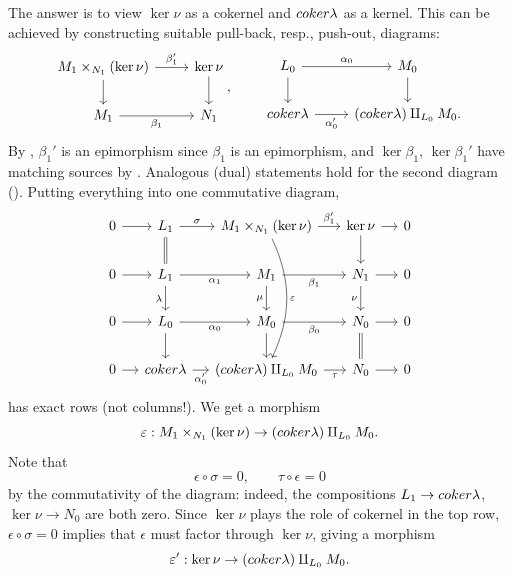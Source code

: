 The answer is to view $\ker\nu$ as a cokernel and $coker\lambda$ as a
kernel. This can be achieved by constructing suitable pull-back,
resp., push-out, diagrams:
\[\begin{tikzcd}
    M_1 \times_{N_1} (\ker\nu) \arrow[r, "\beta_1'"] \arrow[d] &
    \ker\nu \arrow[d] \\
    M_1 \arrow[r, "\beta_1"'] & N_1
  \end{tikzcd}\!, \qquad
  \begin{tikzcd}
    L_0 \arrow[r, "\alpha_0"] \arrow[d] & M_0 \arrow[d] \\
    \coker\lambda \arrow[r, "\alpha_0'"'] & (\coker\lambda)
    \amalg_{L_0} M_0.
  \end{tikzcd}\] By , $\beta_1'$ is an
epimorphism since $\beta_1$ is an epimorphism, and $\ker\beta_1$,
$\ker\beta_1'$ have matching sources by
. Analogous (dual)
statements hold for the second diagram
().
Putting everything into one commutative diagram,
\[\begin{tikzcd}[column sep=small]
    0 \arrow[r] & L_1 \arrow[r, "\sigma"] \arrow[d, equal] & M_1
    \times_{N_1} (\ker\nu) \arrow[r, "\beta_1'"] \arrow[ddd,
    "\epsilon", bend left=25] &
    \ker\nu \arrow[r] \arrow[d] & 0 \\
    0 \arrow[r] & L_1 \arrow[r, "\alpha_1"'] \arrow[d, "\lambda"'] &
    M_1 \arrow[r, "\beta_1"'] \arrow[d, "\mu"'] &
    N_1 \arrow[r] \arrow[d, "\nu"'] & 0 \\
    0 \arrow[r] & L_0 \arrow[r, "\alpha_0"'] \arrow[d] & M_0 \arrow[r,
    "\beta_0"'] \arrow[d] &
    N_0 \arrow[r] \arrow[d, equal] & 0 \\
    0 \arrow[r] & \coker\lambda \arrow[r, "\alpha_0'"'] &
    (\coker\lambda) \amalg_{L_0} M_0 \arrow[r, "\tau"'] & N_0
    \arrow[r] & 0
  \end{tikzcd}\] has exact rows (not columns!). We get a morphism
\[
  \varepsilon : M_1 \times_{N_1} (\ker\nu) \to (coker\lambda)
  \amalg_{L_0} M_0.
\]
Note that
\[
  \epsilon \circ \sigma = 0, \qquad \tau \circ \epsilon = 0
\]
by the commutativity of the diagram: indeed, the compositions
$L_1 \to coker\lambda$, $\ker\nu \to N_0$ are both zero.  Since
$\ker\nu$ plays the role of cokernel in the top row,
$\epsilon \circ \sigma = 0$ implies that $\epsilon$ must factor
through $\ker\nu$, giving a morphism
\[
  \varepsilon' : \ker\nu \to (coker\lambda) \amalg_{L_0} M_0.
\]
